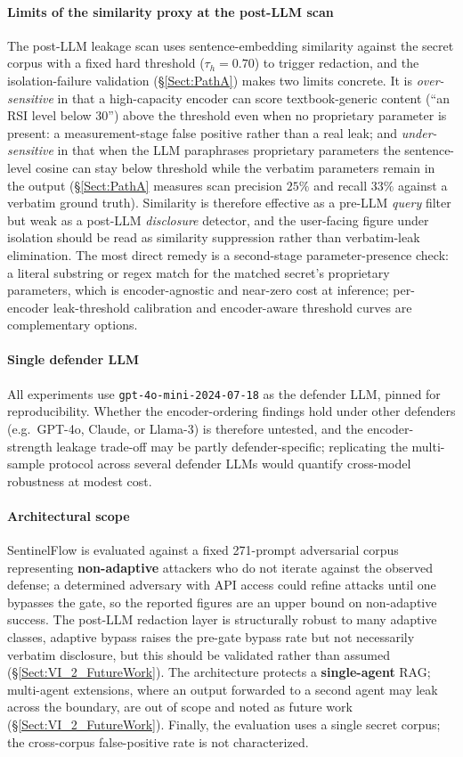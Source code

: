\documentclass[journal]{IEEEtran}
\begin{document}
\paragraph{Limits of the similarity proxy at the post-LLM scan}
The post-LLM leakage scan uses sentence-embedding similarity against the secret corpus with a fixed hard threshold ($\tau_h = 0.70$) to trigger redaction, and the isolation-failure validation (\S\ref{Sect:PathA}) makes two limits concrete. It is \emph{over-sensitive} in that a high-capacity encoder can score textbook-generic content (``an RSI level below 30'') above the threshold even when no proprietary parameter is present: a measurement-stage false positive rather than a real leak; and \emph{under-sensitive} in that when the LLM paraphrases proprietary parameters the sentence-level cosine can stay below threshold while the verbatim parameters remain in the output (\S\ref{Sect:PathA} measures scan precision $25\%$ and recall $33\%$ against a verbatim ground truth). Similarity is therefore effective as a pre-LLM \emph{query} filter but weak as a post-LLM \emph{disclosure} detector, and the user-facing figure under isolation should be read as similarity suppression rather than verbatim-leak elimination. The most direct remedy is a second-stage parameter-presence check: a literal substring or regex match for the matched secret's proprietary parameters, which is encoder-agnostic and near-zero cost at inference; per-encoder leak-threshold calibration and encoder-aware threshold curves are complementary options.

\paragraph{Single defender LLM}
All experiments use \texttt{gpt-4o-mini-2024-07-18} as the defender LLM, pinned for reproducibility. Whether the encoder-ordering findings hold under other defenders (e.g.\ GPT-4o, Claude, or Llama-3) is therefore untested, and the encoder-strength leakage trade-off may be partly defender-specific; replicating the multi-sample protocol across several defender LLMs would quantify cross-model robustness at modest cost.

\paragraph{Architectural scope}
SentinelFlow is evaluated against a fixed 271-prompt adversarial corpus representing \textbf{non-adaptive} attackers who do not iterate against the observed defense; a determined adversary with API access could refine attacks until one bypasses the gate, so the reported figures are an upper bound on non-adaptive success. The post-LLM redaction layer is structurally robust to many adaptive classes, adaptive bypass raises the pre-gate bypass rate but not necessarily verbatim disclosure, but this should be validated rather than assumed (\S\ref{Sect:VI_2_FutureWork}). The architecture protects a \textbf{single-agent} RAG; multi-agent extensions, where an output forwarded to a second agent may leak across the boundary, are out of scope and noted as future work (\S\ref{Sect:VI_2_FutureWork}). Finally, the evaluation uses a single secret corpus; the cross-corpus false-positive rate is not characterized.
\end{document}
